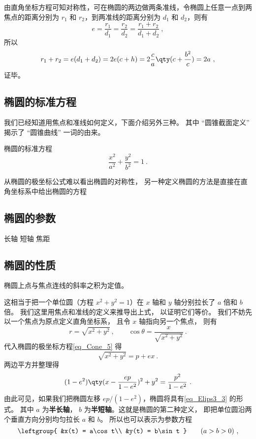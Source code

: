 由直角坐标方程可知对称性，可在椭圆的两边做两条准线，令椭圆上任意一点到两焦点的距离分别为 $r_1$ 和 $r_2$，到两准线的距离分别为 $d_1$ 和 $d_2$，则有
\begin{equation}
e = \frac{r_1}{d_1} = \frac{r_2}{d_2} = \frac{r_1 + r_2}{d_1 + d_2}~,
\end{equation}
所以
\begin{equation}\label{eq_Elips3_9}
r_1 + r_2 = e(d_1+d_2) = 2e(c + h) = 2\frac{c}{a} \qty( c + \frac{b^2}{c} ) = 2a~,
\end{equation}
证毕。

\subsection{椭圆的标准方程}

我们已经知道用焦点和准线如何定义，下面介绍另外三种。 其中 “圆锥截面定义” 揭示了 “圆锥曲线” 一词的由来。

\begin{definition}{椭圆的标准方程}
\begin{equation}\label{eq_Elips3_3}
\frac{x^2}{a^2} + \frac{y^2}{b^2} = 1~.
\end{equation}
\end{definition}

从椭圆的极坐标公式难以看出椭圆的对称性， 另一种定义椭圆的方法是直接在直角坐标系中给出椭圆的方程
\subsection{椭圆的参数}
长轴
短轴
焦距

\subsection{椭圆的性质}

椭圆上点与焦点连线的斜率之积为定值。




这相当于把一个单位圆（方程 $x^2 + y^2 = 1$）在 $x$ 轴和 $y$ 轴分别拉长了 $a$ 倍和 $b$ 倍。 我们这里用焦点和准线的定义来推导出上式， 以证明它们等价。 我们不妨先以一个焦点为原点定义直角坐标系， 且令 $x$ 轴指向另一个焦点， 则有
\begin{equation}
r = \sqrt{x^2 + y^2}~, \qquad \cos\theta = \frac{x}{\sqrt{x^2 + y^2}}~.
\end{equation}
代入椭圆的极坐标方程\autoref{eq_Cone_5}  得
\begin{equation}
\sqrt{x^2 + y^2} = p + ex~.
\end{equation}
两边平方并整理得
\begin{equation}\label{eq_Elips3_2}
(1 - e^2) \qty( x - \frac{ep}{1 - e^2} )^2 + y^2 = \frac{p^2}{1 - e^2}~.
\end{equation}
由此可见，如果我们把椭圆左移 $ep/(1 - e^2)$，椭圆将具有\autoref{eq_Elips3_3} 的形式。 其中 $a$ 为\textbf{半长轴}， $b$ 为\textbf{半短轴}。这就是椭圆的第二种定义， 即把单位圆沿两个垂直方向分别均匀拉长 $a$ 和 $b$。 所以也可以表示为参数方程
\begin{equation}\label{eq_Elips3_1}
\leftgroup{
&x(t) = a\cos t\\
&y(t) = b\sin t
} \qquad
(a > b > 0)~,
\end{equation}

